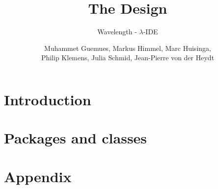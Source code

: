 \documentclass[a4paper, parskip=half]{scrartcl}
\title{The Design}
\subtitle{Wavelength - $\lambda$-IDE}
\author{Muhammet Guemues, Markus Himmel, Marc Huisinga,\\Philip Klemens, Julia Schmid, Jean-Pierre von der Heydt}
\begin{document}
\maketitle
\thispagestyle{empty}
\newpage
\tableofcontents
\newpage
\section{Introduction}
\section{Packages and classes}



\section{Appendix}

\end{document}

